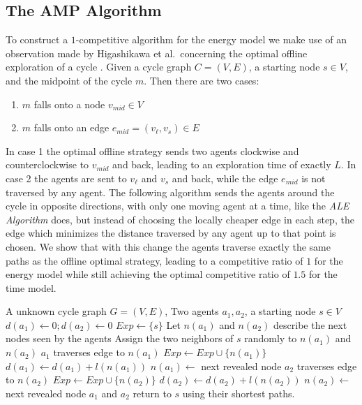 \subsection{The AMP Algorithm}

To construct a $1$-competitive algorithm for the energy model we make use of an observation made by Higashikawa et al.\ concerning the optimal offline exploration 
of a cycle \cite{Higashikawa2012}. Given a cycle graph $C=(V,E)$, a starting node $s \in V$, and the midpoint of the cycle $m$. Then there are two cases:

\begin{enumerate}
    \item $m$ falls onto a node $v_{mid} \in V$ 
    \item $m$ falls onto an edge $e_{mid} = (v_\ell, v_s) \in E$ 
\end{enumerate}

In case 1 the optimal offline strategy sends two agents clockwise and counterclockwise to $v_{mid}$ and back, leading to an exploration time of exactly $L$. In case 2 the agents
are sent to $v_\ell$ and $v_s$ and back, while the edge $e_{mid}$ is not traversed by any agent. The following algorithm sends the agents around the cycle in opposite directions,
with only one moving agent at a time, like the \textit{ALE Algorithm} does, but instead of choosing the locally cheaper edge in each step, the edge which minimizes the distance
traversed by any agent up to that point is chosen. We show that with this change the agents traverse exactly the same paths as the offline optimal strategy, leading to a competitive ratio
of $1$ for the energy model while still achieving the optimal competitive ratio of $1.5$ for the time model.


    \begin{algorithm}[H]
        \caption{AMP (Avoid Midpoint)}\label{alg:cap}
        \begin{algorithmic}
        \small
        \Require A unknown cycle graph $G=(V,E)$, Two agents $a_1, a_2$, a starting node $s \in V$
        \State $d(a_1) \gets 0; d(a_2) \gets 0$ 
        \State $Exp \gets \{s\}$ 
        \State Let $n(a_1)$ and $n(a_2)$ describe the next nodes seen by the agents
        \State Assign the two neighbors of $s$ randomly to $n(a_1)$ and $n(a_2)$
         
            \State $a_1$ traverses edge to $n(a_1)$ 
            \State $Exp \gets Exp \cup \{n(a_1)\}$
            \State $d(a_1) \gets d(a_1) + l(n(a_1))$
            \State $n(a_1) \gets$ next revealed node
        \Else 
            \State $a_2$ traverses edge to $n(a_2)$
            \State $Exp \gets Exp \cup \{n(a_2)\}$
            \State $d(a_2) \gets d(a_2) + l(n(a_2))$
            \State $n(a_2) \gets$ next revealed node
        \EndIf
        \EndWhile
        \State $a_1$ and $a_2$ return to $s$ using their shortest paths.
        \end{algorithmic}
        \end{algorithm}

